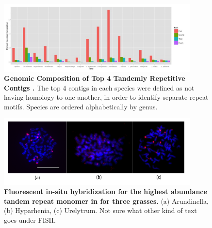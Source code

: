\documentclass[10pt,letterpaper]{article}
\begin{document}
\begin{figure}[h]
\begin{center}
\includegraphics[width=4in]{Rankstrfcontent.png}
\end{center}
\caption{{\bf Genomic Composition of Top 4 Tandemly Repetitive Contigs .}
The top 4 contigs in each species were defined as not having homology to one another, in order to identify separate repeat motifs.
Species are ordered alphabetically by genus.
}
\label{ranktrf}
\end{figure}

\begin{figure}[h]
\begin{center}
\includegraphics[width=4in]{FISH_Figure.png}
\end{center}
\caption{{\bf Fluorescent in-situ hybridization for the highest abundance tandem repeat monomer in for three grasses.}
(a) Arundinella, (b) Hyparhenia, (c) Urelytrum.
Not sure what other kind of text goes under FISH.}
\label{FISH}
\end{figure}

%
\end{document}
